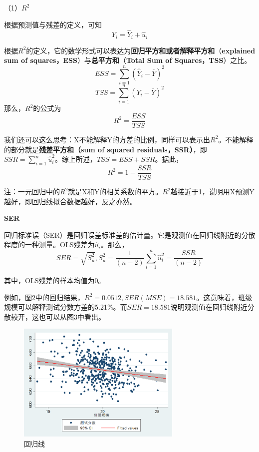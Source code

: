 \documentclass[cn,10pt,math=newtx,citestyle=gb7714-2015,bibstyle=gb7714-2015]{elegantbook}
\begin{document}
	（1）\textbf{$R^2$}
	
	根据预测值与残差的定义，可知
	\begin{equation}
		Y_i=\hat{Y}_i+\hat{u}_i
	\end{equation}
	
	根据$R^2$的定义，它的数学形式可以表达为\textbf{回归平方和或者解释平方和}（\textbf{explained sum of squares，ESS}）与\textbf{总平方和}（\textbf{Total Sum of Squares，TSS}）之比。
	\begin{equation}
		ESS=\sum_{i=1}^n{(\hat{Y}_i-\overline{Y})^2}
	\end{equation}
	\begin{equation}
		TSS=\sum_{i=1}^n{(Y_i-\overline{Y})^2}
	\end{equation}
	那么，$R^2$的公式为
	\begin{equation}
		R^2=\frac{ESS}{TSS}
	\end{equation}
	
	我们还可以这么思考：X不能解释Y的方差的比例，同样可以表示出$R^2$。不能解释的部分就是\textbf{残差平方和（sum of squared residuals，SSR）}，即$SSR=\sum_{i=1}^n{\hat{u}_i^2}$。综上所述，$TSS=ESS+SSR$。据此，
	\begin{equation}
		R^2=1-\frac{SSR}{TSS}
	\end{equation}
	
	注：一元回归中的$R^2$就是X和Y的相关系数的平方。$R^2$越接近于1，说明用X预测Y越好，即回归线拟合数据越好，反之亦然。
	
	\textbf{SER}
	
	回归标准误（SER）是回归误差标准差的估计量。它是观测值在回归线附近的分散程度的一种测量。OLS残差为$\hat{u}_i$。那么，
	\begin{equation}
		SER=\sqrt{S_{\hat{u}}^2},S_{\hat{u}}^2=\frac{1}{(n-2)}\sum_{i=1}^{n}{\hat{u}_i^2}=\frac{SSR}{(n-2)}
	\end{equation}
	
	其中，OLS残差的样本均值为0。
	
	例如，图2中的回归结果，$R^2=0.0512,SER(MSE)=18.581$。这意味着，班级规模可以解释测试分数方差的5.21\%。而$SER=18.581$说明观测值在回归线附近分散较开，这也可以从图3中看出。
	\begin{figure}[htbp]
		\centering
		\includegraphics[width=0.7\textwidth]{Rline.png}
		\caption{回归线}\label{fig:digit}
	\end{figure}
	
\end{document}
